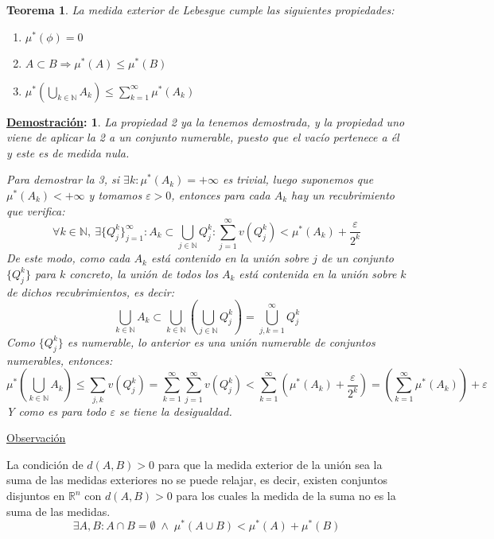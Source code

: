 \documentclass[10pt,a4paper,openright]{book}
\theoremstyle{break}
\newtheorem*{theo}{Teorema}
\newtheorem*{demo}{\underline{Demostración}:}
\begin{document}
\begin{theo}
    La medida exterior de Lebesgue cumple las siguientes propiedades: 
    \begin{enumerate}
        \item $ \mu^*\left( \phi \right) = 0 $ 
        \item $A \subset B \Rightarrow \mu^*\left( A \right) \le \mu^*\left( B \right)$
        \item $ \mu^*\left( \bigcup_{k\in \mathbb{N}} A_k \right) \le \sum_{k=1}^{\infty} \mu^*\left( A_k \right)$
    \end{enumerate}
\end{theo}
 \begin{demo}
La propiedad 2 ya la tenemos demostrada, y la propiedad uno viene de aplicar la 2 a un conjunto numerable, puesto que el vacío pertenece a él y este es de medida nula. 

Para demostrar la 3, si $\exists k: \mu^*\left( A_k \right) = +\infty$ es trivial, luego suponemos que $ \mu^*\left( A_k \right) < +\infty$ y tomamos $ \varepsilon>0$, entonces para cada $A_k$ hay un recubrimiento que verifica:
$$ \forall k \in \mathbb N, \ \exists \{Q_j^k\}_{j=1}^\infty : A_k \subset \bigcup_{j \in \mathbb{N}} Q_j^{k} : \sum_{j=1}^{\infty} v\left( Q_j^k \right) < \mu^*\left( A_k \right) + \frac{\varepsilon}{2^k}
$$
De este modo, como cada $A_k$ está contenido en la unión sobre $j$ de un conjunto $\{Q_j^k\}$ para $k$ concreto, la unión de todos los $A_k$ está contenida en la unión sobre $k$ de dichos recubrimientos, es decir: 
$$\bigcup_{k \in \mathbb{N}} A_k \subset \bigcup_{k \in \mathbb{N}} \left(\bigcup_{j \in \mathbb{N}} Q_j^k  \right) = \bigcup_{j, k = 1} ^{\infty} Q_j^k$$
Como $\{Q_j^k\}$ es numerable, lo anterior es una unión numerable de conjuntos numerables,  entonces:
$$\mu^*\left( \bigcup_{k\in \mathbb{N}} A_k \right) \le \sum_{j, k} v\left( Q_j^k \right) = \sum_{k=1}^{\infty} \sum_{j=1}^{\infty} v\left( Q_j^k \right) < \sum_{k=1}^{\infty} \left( \mu^*\left( A_k \right) + \frac{\varepsilon}{2^k} \right) = \left( \sum_{k=1}^{\infty} \mu^*\left( A_k \right) \right) + \varepsilon $$
Y como es para todo $\varepsilon$ se tiene la desigualdad.
\end{demo}

\underline{Observación}

La condición de $d(A,B) > 0$ para que la medida exterior de la unión sea la suma de las medidas exteriores no se puede relajar, es decir, existen conjuntos disjuntos en $\mathbb{R}^n $ con $d(A,B)>0$ para los cuales la medida de la suma no es la suma de las medidas.
$$\exists A, B: A\cap B = \emptyset\; \land \;\mu^*\left( A\cup B \right) < \mu^*\left( A \right) + \mu^*\left( B \right)$$
\end{document}
